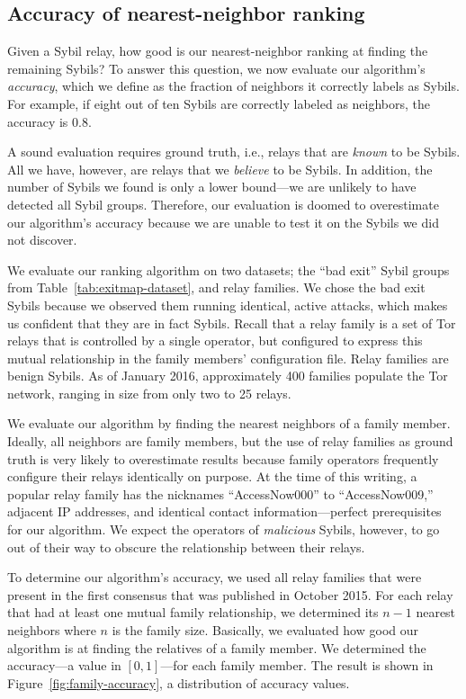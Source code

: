 \subsection{Accuracy of nearest-neighbor ranking}
\label{sec:accuracy}
Given a Sybil relay, how good is our nearest-neighbor ranking at finding the
remaining Sybils?  To answer this question, we now evaluate our algorithm's
\emph{accuracy}, which we define as the fraction of neighbors it correctly
labels as Sybils.  For example, if eight out of ten Sybils are correctly
labeled as neighbors, the accuracy is 0.8.

A sound evaluation requires ground truth, i.e., relays that are \emph{known} to
be Sybils.  All we have, however, are relays that we \emph{believe} to be
Sybils.  In addition, the number of Sybils we found is only a lower bound---we
are unlikely to have detected all Sybil groups.  Therefore, our evaluation is
doomed to overestimate our algorithm's accuracy because we are unable to test
it on the Sybils we did not discover.

We evaluate our ranking algorithm on two datasets; the ``bad exit'' Sybil
groups from Table~\ref{tab:exitmap-dataset}, and relay families.  We chose the
bad exit Sybils because we observed them running identical, active attacks,
which makes us confident that they are in fact Sybils.  Recall that a relay
family is a set of Tor relays that is controlled by a single operator, but
configured to express this mutual relationship in the family members'
configuration file.  Relay families are benign Sybils.  As of January 2016,
approximately 400 families populate the Tor network, ranging in size from only
two to 25 relays.

We evaluate our algorithm by finding the nearest neighbors of a family member.
Ideally, all neighbors are family members, but the use of relay families as
ground truth is very likely to overestimate results because family operators
frequently configure their relays identically on purpose.  At the time of this
writing, a popular relay family has the nicknames ``AccessNow000'' to
``AccessNow009,'' adjacent IP addresses, and identical contact
information---perfect prerequisites for our algorithm.  We expect the operators
of \emph{malicious} Sybils, however, to go out of their way to obscure the
relationship between their relays.

To determine our algorithm's accuracy, we used all relay families that were
present in the first consensus that was published in October 2015.  For each
relay that had at least one mutual family relationship, we determined its $n -
1$ nearest neighbors where $n$ is the family size.  Basically, we evaluated how
good our algorithm is at finding the relatives of a family member.  We
determined the accuracy---a value in $[0,1]$---for each family member.  The
result is shown in Figure~\ref{fig:family-accuracy}, a distribution of accuracy
values.

